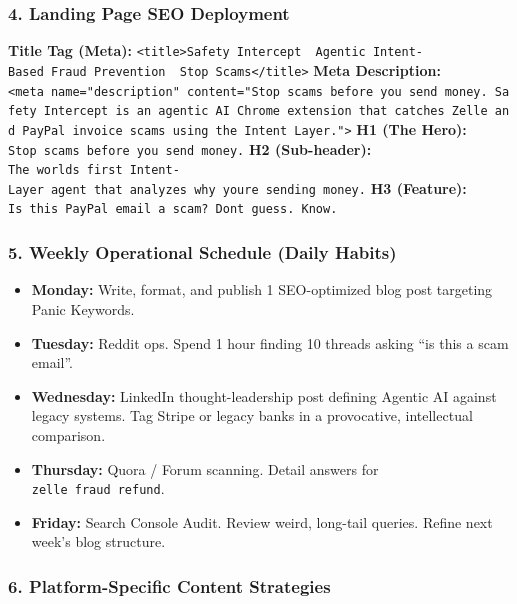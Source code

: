 \documentclass[
]{article}
\providecommand{\tightlist}{%
  \setlength{\itemsep}{0pt}\setlength{\parskip}{0pt}}
\begin{document}
\subsubsection{4. Landing Page SEO
Deployment}\label{landing-page-seo-deployment}

\textbf{Title Tag (Meta):}
\texttt{\textless{}title\textgreater{}Safety\ Intercept\ \textbar{}\ Agentic\ Intent-Based\ Fraud\ Prevention\ \textbar{}\ Stop\ Scams\textless{}/title\textgreater{}}
\textbf{Meta Description:}
\texttt{\textless{}meta\ name="description"\ content="Stop\ scams\ before\ you\ send\ money.\ Safety\ Intercept\ is\ an\ agentic\ AI\ Chrome\ extension\ that\ catches\ Zelle\ and\ PayPal\ invoice\ scams\ using\ the\ Intent\ Layer."\textgreater{}}
\textbf{H1 (The Hero):} \texttt{Stop\ scams\ before\ you\ send\ money.}
\textbf{H2 (Sub-header):}
\texttt{The\ world\textquotesingle{}s\ first\ Intent-Layer\ agent\ that\ analyzes\ why\ you\textquotesingle{}re\ sending\ money.}
\textbf{H3 (Feature):}
\texttt{Is\ this\ PayPal\ email\ a\ scam?\ Don\textquotesingle{}t\ guess.\ Know.}

\subsubsection{5. Weekly Operational Schedule (Daily
Habits)}\label{weekly-operational-schedule-daily-habits}

\begin{itemize}
\tightlist
\item
  \textbf{Monday:} Write, format, and publish 1 SEO-optimized blog post
  targeting Panic Keywords.
\item
  \textbf{Tuesday:} Reddit ops. Spend 1 hour finding 10 threads asking
  ``is this a scam email''.
\item
  \textbf{Wednesday:} LinkedIn thought-leadership post defining Agentic
  AI against legacy systems. Tag Stripe or legacy banks in a
  provocative, intellectual comparison.
\item
  \textbf{Thursday:} Quora / Forum scanning. Detail answers for
  \texttt{zelle\ fraud\ refund}.
\item
  \textbf{Friday:} Search Console Audit. Review weird, long-tail
  queries. Refine next week's blog structure.
\end{itemize}

\subsubsection{6. Platform-Specific Content
Strategies}\label{platform-specific-content-strategies}
\end{document}
